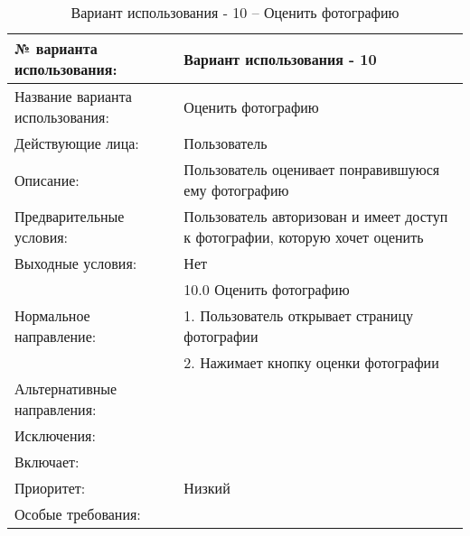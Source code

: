 \begin{table}[H]
  \caption{Вариант использования - 10 – Оценить фотографию}\label{use-case-10-table}
  \begin{tabular}{|p{6cm}|p{10cm}|}
  \hline № варианта использования: & Вариант использования - 10 \\
  \hline Название варианта использования: & Оценить фотографию \\
  \hline Действующие лица: & Пользователь \\
  \hline Описание: & Пользователь оценивает понравившуюся ему фотографию \\
  \hline Предварительные условия: & Пользователь авторизован и имеет доступ к фотографии, которую хочет оценить \\
  \hline Выходные условия: & Нет \\
  \hline \multirow{3}{*}{Нормальное направление:} & 10.0 Оценить фотографию \\
  \cline{2-2} & 1. Пользователь открывает страницу фотографии \\
  \cline{2-2} & 2. Нажимает кнопку оценки фотографии \\
  \hline Альтернативные направления: &  \\
  \hline Исключения: &  \\
  \hline Включает: &  \\
  \hline Приоритет: & Низкий \\
  \hline Особые требования: &  \\
  \hline 
  \end{tabular}
\end{table}

